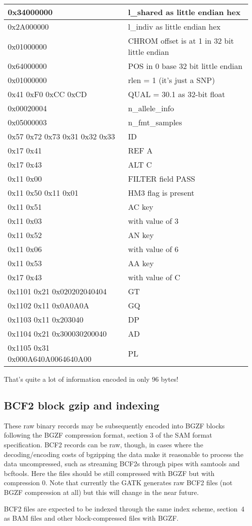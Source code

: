 \documentclass[8pt]{article}
\begin{document}
\vspace{0.3cm}
\begin{tabular}{|l| l|} \hline
0x34000000 & l\_shared as little endian hex \\ \hline
0x2A000000 & l\_indiv as little endian hex \\ \hline
0x01000000 & CHROM offset is at 1 in 32 bit little endian \\ \hline
0x64000000 & POS in 0 base 32 bit little endian \\ \hline
0x01000000 & rlen = 1 (it's just a SNP) \\ \hline
0x41 0xF0 0xCC 0xCD & QUAL = 30.1 as 32-bit float \\ \hline
0x00020004 & n\_allele\_info \\ \hline
0x05000003 & n\_fmt\_samples \\ \hline
0x57 0x72 0x73 0x31 0x32 0x33 & ID \\ \hline
0x17 0x41 & REF A \\ \hline
0x17 0x43 & ALT C \\ \hline
0x11 0x00 & FILTER field PASS \\ \hline
0x11 0x50 0x11 0x01 & HM3 flag is present \\ \hline
0x11 0x51 & AC key \\ \hline
0x11 0x03 & with value of 3 \\ \hline
0x11 0x52 & AN key \\ \hline
0x11 0x06 & with value of 6 \\ \hline
0x11 0x53 & AA key \\ \hline
0x17 0x43 & with value of C \\ \hline
0x1101 0x21 0x020202040404 & GT \\ \hline
0x1102 0x11 0x0A0A0A & GQ \\ \hline
0x1103 0x11 0x203040 & DP \\ \hline
0x1104 0x21 0x300030200040 & AD \\ \hline
0x1105 0x31 0x000A640A0064640A00 & PL \\ \hline
\end{tabular}
\vspace{0.3cm}

That's quite a lot of information encoded in only 96 bytes!

\subsection{BCF2 block gzip and indexing}

These raw binary records may be subsequently encoded into BGZF blocks following
the BGZF compression format, section 3 of the SAM format specification.
BCF2 records can be raw, though, in cases where the decoding/encoding costs of
bgzipping the data make it reasonable to process the data uncompressed, such as
streaming BCF2s through pipes with samtools and bcftools.  Here the files
should be still compressed with BGZF but with compression 0.  Note that
currently the GATK generates raw BCF2 files (not BGZF compression at all) but
this will change in the near future.

BCF2 files are expected to be indexed through the same index scheme,
section~4 as BAM files and other block-compressed files with BGZF.
\end{document}
